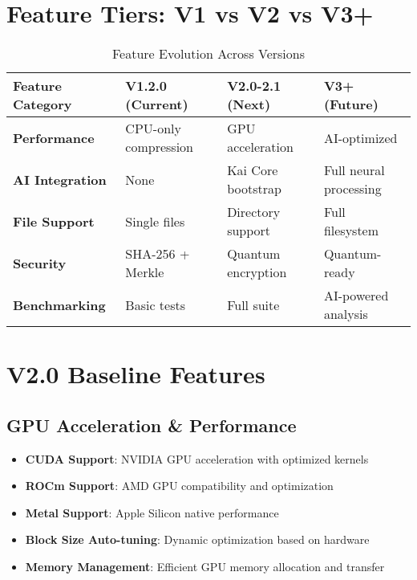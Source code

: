 \documentclass[12pt,a4paper]{article}
\begin{document}
\section{Feature Tiers: V1 vs V2 vs V3+}

\begin{table}[h]
\centering
\begin{tabular}{|l|l|l|l|}
\hline
\textbf{Feature Category} & \textbf{V1.2.0 (Current)} & \textbf{V2.0-2.1 (Next)} & \textbf{V3+ (Future)} \\
\hline
\rowcolor{v2blue!10}
\textbf{Performance} & CPU-only compression & GPU acceleration & AI-optimized \\
\hline
\textbf{AI Integration} & None & Kai Core bootstrap & Full neural processing \\
\hline
\textbf{File Support} & Single files & Directory support & Full filesystem \\
\hline
\textbf{Security} & SHA-256 + Merkle & Quantum encryption & Quantum-ready \\
\hline
\textbf{Benchmarking} & Basic tests & Full suite & AI-powered analysis \\
\hline
\end{tabular}
\caption{Feature Evolution Across Versions}
\end{table}

\section{V2.0 Baseline Features}

\subsection{GPU Acceleration \& Performance}
\begin{itemize}
    \item \textbf{CUDA Support}: NVIDIA GPU acceleration with optimized kernels
    \item \textbf{ROCm Support}: AMD GPU compatibility and optimization
    \item \textbf{Metal Support}: Apple Silicon native performance
    \item \textbf{Block Size Auto-tuning}: Dynamic optimization based on hardware
    \item \textbf{Memory Management}: Efficient GPU memory allocation and transfer
\end{itemize}
\end{document}
